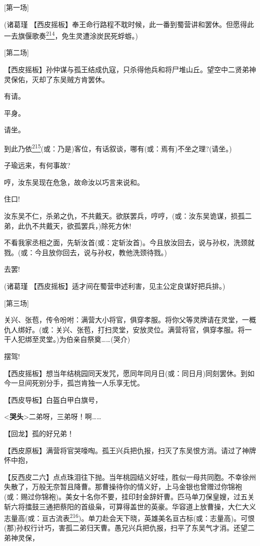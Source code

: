 {[}第一场{]}

(诸葛瑾
【西皮摇板】奉王命行路程不耽时候，此一番到蜀营讲和罢休。但愿得此一去旗偃歌奏\protect\hyperlink{fn214}{\textsuperscript{214}}，免生灵遭涂炭民死蜉蝣。)

{[}第二场{]}

【西皮摇板】孙仲谋与孤王结成仇寇，只杀得他兵和将尸堆山丘。望空中二贤弟神灵保佑，灭却了东吴贼方肯罢休。

有请。

平身。

请坐。

到此乃依\protect\hyperlink{fn215}{\textsuperscript{215}}(或：乃是)客位，有话叙谈，哪有(或：焉有)不坐之理?(请坐。)

子瑜远来，有何事故?

哼，汝东吴现在危急，故命汝以巧言来说和。

住口!

汝东吴不仁，杀弟之仇，不共戴天。欲朕罢兵，哼哼，(或：汝东吴诡谋，损孤二弟，此仇不共戴天，欲孤罢兵，)除死方休!

不看我家丞相之面，先斩汝首(或：定斩汝首)。今且放汝回去，说与孙权，洗颈就戮。(或：今且放你回去，说与孙权，教他洗颈待戮。)

去罢!

(诸葛瑾 【西皮摇板】适才间在蜀营申述利害，见主公定良谋好把兵排。)

{[}第三场{]}

关兴、张苞，传令吩咐：满营大小将官，俱穿孝服。将你父等灵牌请在灵堂，一概仇人绑好。(或：关兴、张苞，打扫灵堂，安放灵位。满营将官，俱穿孝服。将一干人犯绑至灵堂。)为伯亲自祭奠\ldots{}\ldots{}(哭介)

摆驾!

【西皮摇板】想当年结桃园同天发咒，愿同年同月日(或：同日月)同刻罢休。到如今一旦间死别分手，孤岂肯独一人乐享无忧。

【西皮导板】白盔白甲白旗号，

\textless{}\textbf{哭头}\textgreater{}二弟呀，三弟呀！啊\ldots{}\ldots{}

【回龙】孤的好兄弟！

【西皮原板】满营将官哭嚎啕。孤王兴兵把仇报，扫灭了东吴恨方消。请过了神牌怀中抱，

【反西皮二六】点点珠泪往下抛。当年桃园结义好哇，胜似一母共同胞。不幸徐州失散了，万般无奈暂且降曹。那曹操待你的情义好，上马金银也曾赠过你锦袍(或：赐过你锦袍)。美女十名你不要，挂印封金辞奸曹。匹马单刀保皇嫂，过五关斩六将擂鼓三通把蔡阳的首级枭，可算得盖世的英豪。华容道上放曹操，大仁大义志量高(或：亘古流表\protect\hyperlink{fn216}{\textsuperscript{216}})。单刀赴会天下晓，英雄美名亘古标(或：志量高)。可恨(那)孙权行计巧，害孤二弟归天曹。愚兄兴兵把仇报，扫平了东吴气才消。还望二弟神灵保，

